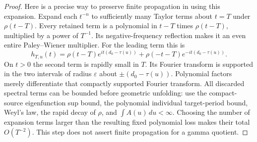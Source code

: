 \begin{proof}
Here is a precise way to preserve finite propagation in using this
expansion. Expand each $t^{-n}$ to sufficiently many Taylor terms
about $t=T$ under $\rho(t-T)$.
Every retained term is a polynomial in $t-T$ times $\rho(t-T)$,
multiplied by a power of $T^{-1}$.
Its negative-frequency reflection makes it an even entire
Paley--Wiener multiplier. For the leading term this is
\[
 h_{T,u}(t)=
 \rho(t-T)e^{it(d_0-\tau(u))}
 +\rho(-t-T)e^{-it(d_0-\tau(u))}.
\]
On $t>0$ the second term is rapidly small in $T$.
Its Fourier transform is supported in the two intervals of radius
$\varepsilon$ about $\pm(d_0-\tau(u))$.
Polynomial factors merely differentiate that compactly supported
Fourier transform.
All discarded spectral terms can be bounded before geometric
unfolding: use the compact-source eigenfunction sup bound,
the polynomial individual target-period bound, Weyl's law, the
rapid decay of $\rho$, and $\int A(u)\,du<\infty$.
Choosing the number of expansion terms larger than the resulting
fixed polynomial loss makes their total $O(T^{-2})$.
This step does not assert finite propagation for a gamma quotient.


\end{proof}
